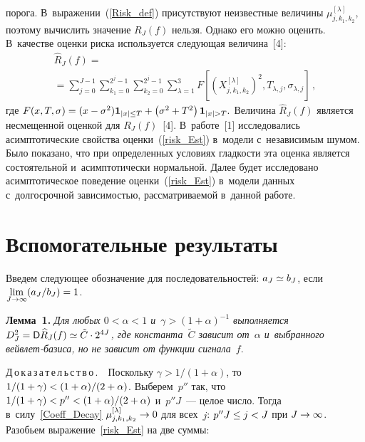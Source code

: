 \begin{multicols}{2}
\columnbreak

\noindent
 порога.
В~выражении~(\ref{Risk_def}) присутствуют неизвестные величины
$\mu_{j,k_1,k_2}^{[\lambda]}$, поэтому вычислить значение $R_J(f)$ нельзя.
Однако его можно оценить. В~качестве оценки риска используется следующая величина~[4]:
\begin{multline}
\label{risk_Est}
\widehat{R}_J (f) = {}\\
{}=\sum\limits_{j=0}^{J-1} \sum\limits_{k_1=0}^{2^j-1}
\sum\limits_{k_2=0}^{2^j-1} \sum\limits_{\lambda=1}^3 F\left[
\left(X_{j,k_1,k_2}^{[\lambda]}
\right)^2,T_{\lambda,j},\sigma_{\lambda,j}\right]\,,
\end{multline}
где
$F(x,T,\sigma) = (x - \sigma^2)\mathbf{1}_{|x|\leq T} \hm+
\left(\sigma^2\hm + T^2\right)\mathbf{1}_{|x|>T}.
$
Величина $\widehat{R}_J(f)$ является несмещенной оценкой для $R_J(f)$~[4].
В~работе~[1] исследовались асимптотические свойства оценки~(\ref{risk_Est})
в~модели с~независимым шумом.
Было показано, что при определенных условиях гладкости эта
оценка является состоятельной и~асимптотически нормальной.
Далее будет исследовано асимптотическое поведение оценки~(\ref{risk_Est})
в~модели данных с~долгосрочной зависимостью, рассматриваемой в~данной работе.

\vspace*{-5pt}

\section{Вспомогательные результаты}

\vspace*{-2pt}

Введем следующее обозначение для последовательностей: $a_J\hm\simeq b_J$,
если $\lim\limits_{J\rightarrow \infty} ({a_J}/{b_J})\hm = 1$.

\vspace*{3pt}

\noindent
\textbf{Лемма~1.}
\textit{Для любых $0<\alpha<1$ и~$\gamma>(1+\alpha)^{-1}$ выполняется
$D_J^2 \hm= \Variance \widehat{R}_J(f)\hm \simeq  \tilde{C}\cdot2^{4J}$,
где константа~$\tilde{C}$ зависит от~$\alpha$ и~выбранного вейвлет-базиса,
но не зависит от функции сигнала}~$f$.

\smallskip

\noindent
Д\,о\,к\,а\,з\,а\,т\,е\,л\,ь\,с\,т\,в\,о\,.\ \ Поскольку
$\gamma > {1}/(1+\alpha)$, то ${1}/(1+\gamma)\hm<(1\hm+\alpha)/(2\hm+\alpha)$.
Выберем~$p''$ так, что ${1}/(1+\gamma)\hm < p'' \hm<
(1\hm+\alpha)/(2\hm+\alpha)$ и~$p''J$~--- целое число.
Тогда в~силу~\eqref{Coeff_Decay} $\mu_{j,k_1,k_2}^{[\lambda]}\hm\to 0$
для всех~$j$: $p''J\hm\leq j\hm< J$ при $J\hm\to \infty$.
Разобьем выражение~\eqref{risk_Est} на две суммы:


\end{multicols}
